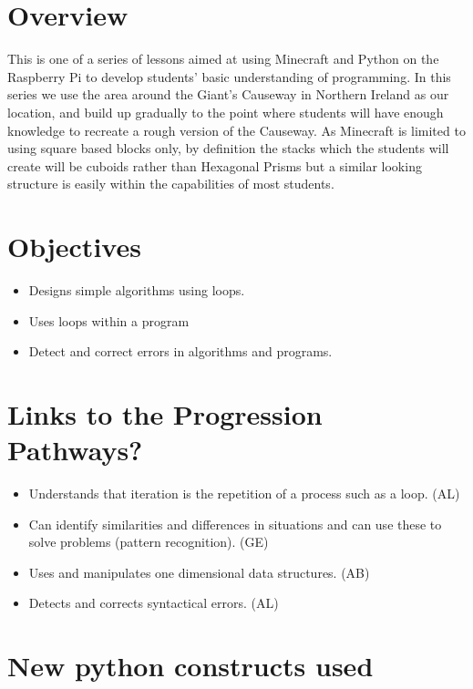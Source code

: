 \documentclass{geocraft-lesson-plan}
\begin{document}
\subtitle{Part 2 - Iteration}

\section*{Overview} This is one of a series of lessons aimed at using Minecraft and Python on the Raspberry Pi to
develop students' basic understanding of programming. In this series we use the area around the Giant's Causeway in
Northern Ireland as our location, and build up gradually to the point where students will have enough knowledge to
recreate a rough version of the Causeway. As Minecraft is limited to using square based blocks only, by definition the
stacks which the students will create will be cuboids rather than Hexagonal Prisms but a similar looking structure is
easily within the capabilities of most students.

\section*{Objectives}
\begin{itemize}
\item Designs simple algorithms using loops.
\item Uses loops within a program
\item Detect and correct errors in algorithms and programs.
\end{itemize}

\section*{Links to the Progression Pathways?}

\begin{itemize}
\item Understands that iteration is the repetition of a process such as a loop. (AL)
\item Can identify similarities and differences in situations and can use these to solve problems (pattern
  recognition). (GE) 
\item Uses and manipulates one dimensional data structures. (AB)
\item Detects and corrects syntactical errors. (AL)
\end{itemize}

\section*{New python constructs used}
\end{document}
